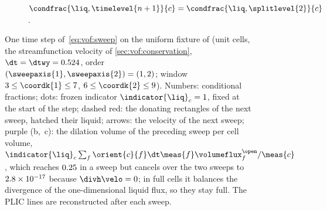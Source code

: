 \begin{figure}
\begin{subfigure}[t]{0.32\textwidth}
    \label{fig:vof:sweeps:first}
  \end{subfigure}%
  \hfill
  \begin{subfigure}[t]{0.32\textwidth}
    \centering
    \caption{$\condfrac{\liq,\timelevel{n+1}}{c}=\condfrac{\liq,\splitlevel{2}}{c}$.}
    \label{fig:vof:sweeps:second}
  \end{subfigure}
  \caption{One time step of~\cref{eq:vof:sweep} on the uniform fixture of
     (unit cells, the streamfunction velocity of
    \cref{sec:vof:conservation}, $\dt=\dtwy=\chkVofSweepDt$, order
    $(\sweepaxis{1},\sweepaxis{2})=(1,2)$; window
    $3\le\coordk{1}\le7$, $6\le\coordk{2}\le9$). Numbers: conditional
    fractions; dots: frozen indicator $\indicator{\liq}_c=1$, fixed at the
    start of the step; dashed red: the donating rectangles of the next sweep,
    hatched their liquid; arrows: the velocity of the next sweep; purple
    (b,~c): the dilation volume of the preceding sweep per cell volume,
    $\indicator{\liq}_c\sum_{f}\orient{c}{f}\dt\meas{f}\volumeflux^{\open}_f/\meas{c}$,
    which reaches $0.25$ in a sweep but cancels over the two
    sweeps to $2.8\times10^{-17}$ because $\divh\velo=0$; in full cells
    it balances the divergence of the one-dimensional liquid flux, so they stay
    full. The PLIC lines are reconstructed after each sweep.}
  \label{fig:vof:sweeps}
\end{figure}
